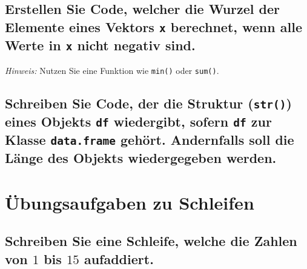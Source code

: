 \documentclass[12pt,a4paper]{article}
\begin{document}
\hypertarget{erstellen-sie-code-welcher-die-wurzel-der-elemente-eines-vektors-berechnet-wenn-alle-werte-in-nicht-negativ-sind.}{%
\subsection{\texorpdfstring{Erstellen Sie Code, welcher die Wurzel der
Elemente eines Vektors \texttt{x} berechnet, wenn alle Werte in
\texttt{x} nicht negativ
sind.}{Erstellen Sie Code, welcher die Wurzel der Elemente eines Vektors  berechnet, wenn alle Werte in  nicht negativ sind.}}\label{erstellen-sie-code-welcher-die-wurzel-der-elemente-eines-vektors-berechnet-wenn-alle-werte-in-nicht-negativ-sind.}}

\emph{Hinweis:} Nutzen Sie eine Funktion wie \texttt{min()} oder
\texttt{sum()}.

\hypertarget{schreiben-sie-code-der-die-struktur-eines-objekts-wiedergibt-sofern-zur-klasse-gehuxf6rt.-andernfalls-soll-die-luxe4nge-des-objekts-wiedergegeben-werden.}{%
\subsection{\texorpdfstring{Schreiben Sie Code, der die Struktur
(\texttt{str()}) eines Objekts \texttt{df} wiedergibt, sofern
\texttt{df} zur Klasse \texttt{data.frame} gehört. Andernfalls soll die
Länge des Objekts wiedergegeben
werden.}{Schreiben Sie Code, der die Struktur () eines Objekts  wiedergibt, sofern  zur Klasse  gehört. Andernfalls soll die Länge des Objekts wiedergegeben werden.}}\label{schreiben-sie-code-der-die-struktur-eines-objekts-wiedergibt-sofern-zur-klasse-gehuxf6rt.-andernfalls-soll-die-luxe4nge-des-objekts-wiedergegeben-werden.}}

\hypertarget{uxfcbungsaufgaben-zu-schleifen}{%
\section{Übungsaufgaben zu
Schleifen}\label{uxfcbungsaufgaben-zu-schleifen}}

\hypertarget{schreiben-sie-eine-schleife-welche-die-zahlen-von-1-bis-15-aufaddiert.}{%
\subsection{\texorpdfstring{Schreiben Sie eine Schleife, welche die
Zahlen von \(1\) bis \(15\)
aufaddiert.}{Schreiben Sie eine Schleife, welche die Zahlen von 1 bis 15 aufaddiert.}}\label{schreiben-sie-eine-schleife-welche-die-zahlen-von-1-bis-15-aufaddiert.}}
\end{document}
